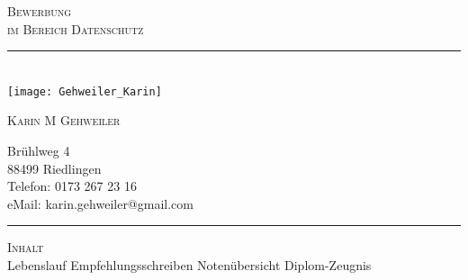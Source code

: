 \documentclass[a4paper,10pt]{article} %
\begin{document}
	
\pagestyle{empty} %

	
\begin{center}
\vspace*{3em}
\textsc{\HUGE Bewerbung}\\[2em]
\textsc{\huge im Bereich Datenschutz}\\[5em]


\newcommand{\HRule}{\rule{\linewidth}{0.5mm}}
\HRule \\[3em]

\texttt{[image: Gehweiler\_Karin]} 
\vspace{3em}

\vspace{6em}
\LARGE
\textsc{Karin M Gehweiler}\\ \vspace{2em}

\large
Brühlweg 4\\
88499 Riedlingen\\
\vspace{1em}
Telefon: 0173 267 23 16\\
eMail: karin.gehweiler@gmail.com\\

\vspace{3em}
\hrule 
\vspace{1em}
\Large
\textsc{Inhalt}\\
\vspace{0.5em}
\large
\textbullet Lebenslauf \textbullet Empfehlungsschreiben
\textbullet Notenübersicht \textbullet Diplom-Zeugnis




\end{center}
\newpage





\pagestyle{empty} %
\end{document}
